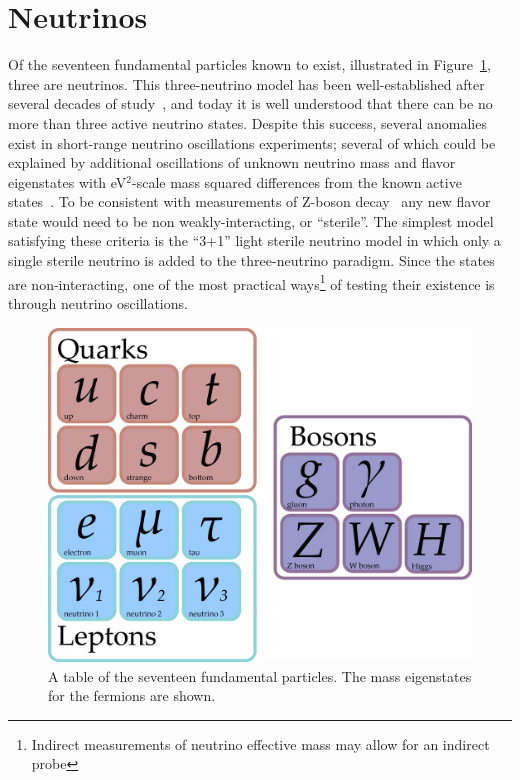 \documentclass[main.tex]{subfiles}
\begin{document}
\section{Neutrinos}

Of the seventeen fundamental particles known to exist, illustrated in Figure~\ref{fig:party}, three are neutrinos. 
This three-neutrino model has been well-established after several decades of study~\cite{PhysRevD.98.030001,Esteban_2019,de_Salas_2018,Capozzi_2016,zboson2006, berns2021recent}, and today it is well understood that there can be no more than three active neutrino states. 
Despite this success, several anomalies exist in short-range neutrino oscillations experiments; several of which could be explained by additional oscillations of unknown neutrino mass and flavor eigenstates with eV$^{2}$-scale mass squared differences from the known active states~\cite{abazajian2012light}. 
To be consistent with measurements of Z-boson decay~\cite{zboson2006} any new flavor state would need to be non weakly-interacting, or ``sterile''. 
The simplest model satisfying these criteria is the ``3+1'' light sterile neutrino model in which only a single sterile neutrino is added to the three-neutrino paradigm. 
Since the states are non-interacting, one of the most practical ways\footnote{Indirect measurements of neutrino effective mass may allow for an indirect probe} of testing their existence is through neutrino oscillations. 

\begin{figure}
    \centering
    \includegraphics[width=0.8\linewidth]{figures/particles.png}
    \caption{A table of the seventeen fundamental particles. The mass eigenstates for the fermions are shown.}\label{fig:party}
\end{figure}
\end{document}
